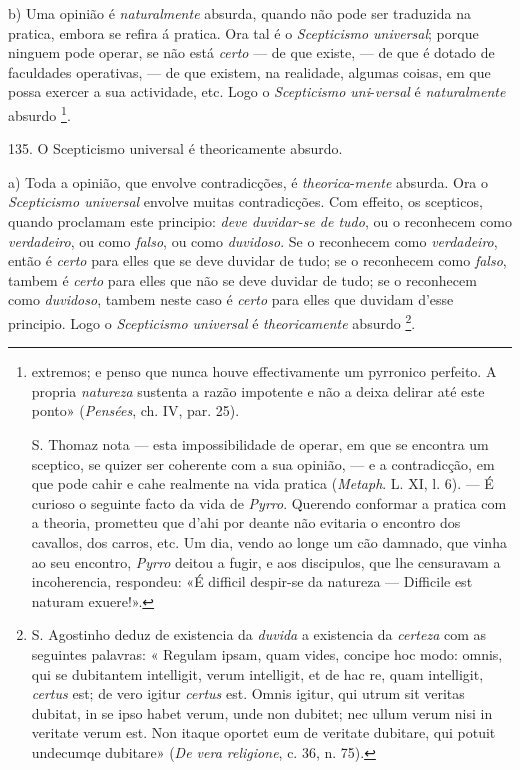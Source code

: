 b) Uma opinião é \emph{naturalmente} absurda, quando não pode ser traduzida na pratica, embora se refira á pratica. Ora tal é o \emph{Scepticismo universal}; porque ninguem pode operar, se não está \emph{certo} --- de que existe, --- de que é dotado de faculdades operativas, --- de que existem, na realidade, algumas coisas, em que possa exercer a sua actividade, etc. Logo o \emph{Scepticismo uni}-\emph{versal} é \emph{naturalmente} absurdo \footnote{extremos; e penso que nunca houve effectivamente um pyrronico perfeito. A propria \emph{natureza} sustenta a razão impotente e não a deixa delirar até este ponto» (\emph{Pensées}, ch. IV, par. 25).\par S. Thomaz nota --- esta impossibilidade de operar, em que se encontra um sceptico, se quizer ser coherente com a sua opinião, --- e a contradicção, em que pode cahir e cahe realmente na vida pratica (\emph{Metaph}. L. XI, l. 6). --- É curioso o seguinte facto da vida de \emph{Pyrro}. Querendo conformar a pratica com a theoria, prometteu que d'ahi por deante não evitaria o encontro dos cavallos, dos carros, etc. Um dia, vendo ao longe um cão damnado, que vinha ao seu encontro, \emph{Pyrro} deitou a fugir, e aos discipulos, que lhe censuravam a incoherencia, respondeu: «É difficil despir-se da natureza --- Difficile est naturam exuere!».}.

135. O Scepticismo universal é theoricamente absurdo.

a) Toda a opinião, que envolve contradicções, é \emph{theorica}-\emph{mente} absurda. Ora o \emph{Scepticismo universal} envolve muitas contradicções. Com effeito, os scepticos, quando proclamam este principio: \emph{deve duvidar-se de tudo}, ou o reconhecem como \emph{verdadeiro}, ou como \emph{falso}, ou como \emph{duvidoso}. Se o reconhecem como \emph{verdadeiro}, então é \emph{certo} para elles que se deve duvidar de tudo; se o reconhecem como \emph{falso}, tambem é \emph{certo} para elles que não se deve duvidar de tudo; se o reconhecem como \emph{duvidoso}, tambem neste caso é \emph{certo} para elles que duvidam d'esse principio. Logo o \emph{Scepticismo universal} é \emph{theoricamente} absurdo \footnote{S. Agostinho deduz de existencia da \emph{duvida} a existencia da \emph{certeza} com as seguintes palavras: « Regulam ipsam, quam vides, concipe hoc modo: omnis, qui se dubitantem intelligit, verum intelligit, et de hac re, quam intelligit, \emph{certus} est; de vero igitur \emph{certus} est. Omnis igitur, qui utrum sit veritas dubitat, in se ipso habet verum, unde non dubitet; nec ullum verum nisi in veritate verum est. Non itaque oportet eum de veritate dubitare, qui potuit undecumqe dubitare» (\emph{De vera religione}, c. 36, n. 75).}.

